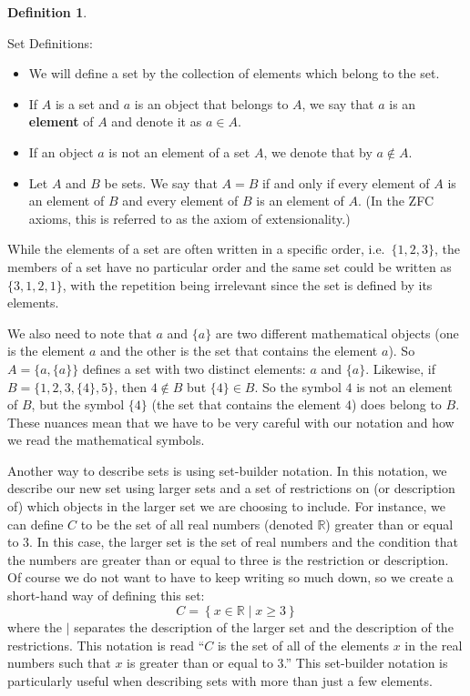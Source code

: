 \documentclass[
]{book}
\theoremstyle{definition}
\newtheorem{definition}{Definition}[chapter]
\theoremstyle{definition}
\theoremstyle{definition}
\theoremstyle{definition}
\theoremstyle{remark}
\begin{document}
\begin{definition}
\protect\hypertarget{def:unlabeled-div-2}{}\label{def:unlabeled-div-2}

Set Definitions:

\begin{itemize}
\item
  We will define a set by the collection of elements which belong to the set.
\item
  If \(A\) is a set and \(a\) is an object that belongs to \(A\), we say that \(a\) is an \textbf{element} of \(A\) and denote it as \(a\in A\).
\item
  If an object \(a\) is not an element of a set \(A\), we denote that by \(a \notin A\).
\item
  Let \(A\) and \(B\) be sets. We say that \(A=B\) if and only if every element of \(A\) is an element of \(B\) and every element of \(B\) is an element of \(A\). (In the ZFC axioms, this is referred to as the axiom of extensionality.)
\end{itemize}

\end{definition}

While the elements of a set are often written in a specific order, i.e.~\(\{1,2,3\}\), the members of a set have no particular order and the same set could be written as \(\{3, 1, 2, 1\}\), with the repetition being irrelevant since the set is defined by its elements.

We also need to note that \(a\) and \(\{a\}\) are two different mathematical objects (one is the element \(a\) and the other is the set that contains the element \(a\)). So \(A = \{a, \{a\}\}\) defines a set with two distinct elements: \(a\) and \(\{a\}\). Likewise, if \(B=\{1, 2, 3, \{4\}, 5\}\), then \(4\notin B\) but \(\{4\}\in B\). So the symbol \(4\) is not an element of \(B\), but the symbol \(\{4\}\) (the set that contains the element \(4\)) does belong to \(B\). These nuances mean that we have to be very careful with our notation and how we read the mathematical symbols.

Another way to describe sets is using set-builder notation. In this notation, we describe our new set using larger sets and a set of restrictions on (or description of) which objects in the larger set we are choosing to include. For instance, we can define \(C\) to be the set of all real numbers (denoted \(\mathbb{R}\)) greater than or equal to \(3\). In this case, the larger set is the set of real numbers and the condition that the numbers are greater than or equal to three is the restriction or description. Of course we do not want to have to keep writing so much down, so we create a short-hand way of defining this set:
\[ C = \left\{ x\in \mathbb{R} \middle \vert x\geq 3\right\}\] where the \(\vert\) separates the description of the larger set and the description of the restrictions. This notation is read ``\(C\) is the set of all of the elements \(x\) in the real numbers such that \(x\) is greater than or equal to 3.'' This set-builder notation is particularly useful when describing sets with more than just a few elements.
\end{document}
